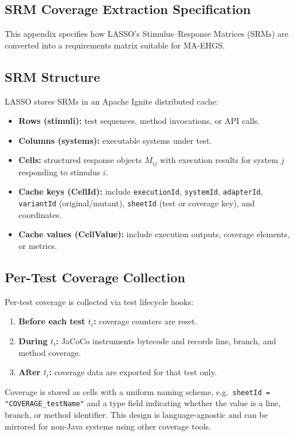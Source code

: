 \begin{appendices}
\section{SRM Coverage Extraction Specification}
\label{app:srm}

This appendix specifies how LASSO's Stimulus--Response Matrices (SRMs) are converted into a requirements matrix suitable for MA-EHGS.

\subsection*{SRM Structure}

LASSO stores SRMs in an Apache Ignite distributed cache:

\begin{itemize}
  \item \textbf{Rows (stimuli):} test sequences, method invocations, or API calls.
  \item \textbf{Columns (systems):} executable systems under test.
  \item \textbf{Cells:} structured response objects $M_{ij}$ with execution results for system $j$ responding to stimulus $i$.
  \item \textbf{Cache keys (CellId):} include \texttt{executionId}, \texttt{systemId}, \texttt{adapterId}, \texttt{variantId} (original/mutant), \texttt{sheetId} (test or coverage key), and coordinates.
  \item \textbf{Cache values (CellValue):} include execution outputs, coverage elements, or metrics.
\end{itemize}

\subsection*{Per-Test Coverage Collection}

Per-test coverage is collected via test lifecycle hooks:

\begin{enumerate}
  \item \textbf{Before each test $t_i$:} coverage counters are reset.
  \item \textbf{During $t_i$:} JaCoCo instruments bytecode and records line, branch, and method coverage.
  \item \textbf{After $t_i$:} coverage data are exported for that test only.
\end{enumerate}

Coverage is stored as cells with a uniform naming scheme, e.g.\ \texttt{sheetId = "COVERAGE\_testName"} and a type field indicating whether the value is a line, branch, or method identifier. This design is language-agnostic and can be mirrored for non-Java systems using other coverage tools.


\end{appendices}
